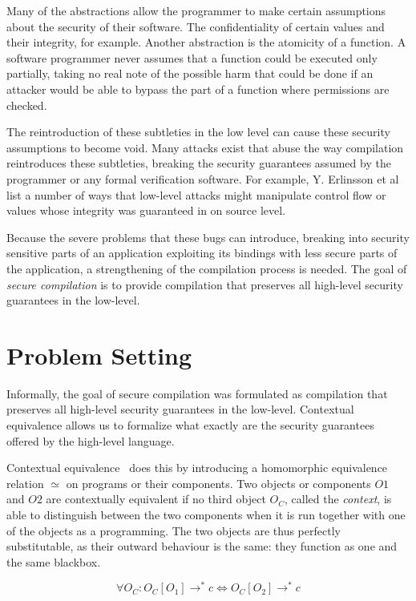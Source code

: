 \documentclass[11pt]{article}
\begin{document}
Many of the abstractions allow the programmer to make certain assumptions about the security of their software.
The confidentiality of certain values and their integrity, for example.
Another abstraction is the atomicity of a function.
A software programmer never assumes that a function could be executed only partially, taking no real note of the possible harm that could be done if an attacker would be able to bypass the part of a function where permissions are checked.

The reintroduction of these subtleties in the low level can cause these security assumptions to become void.
Many attacks exist that abuse the way compilation reintroduces these subtleties, breaking the security guarantees assumed by the programmer or any formal verification software.
For example, Y. Erlinsson et al~\cite{OVSPaper} list a number of ways that low-level attacks might manipulate control flow or values whose integrity was guaranteed in on source level.

Because the severe problems that these bugs can introduce, breaking into security sensitive parts of an application exploiting its bindings with less secure parts of the application, a strengthening of the compilation process is needed.
The goal of \emph{secure compilation} is to provide compilation that preserves all high-level security guarantees in the low-level.

\section{Problem Setting}
Informally, the goal of secure compilation was formulated as compilation that preserves all high-level security guarantees in the low-level.
Contextual equivalence allows us to formalize what exactly are the security guarantees offered by the high-level language.

Contextual equivalence~\cite{Agten:2012:SCM:2354412.2355247} does this by introducing a homomorphic equivalence relation $\simeq$ on programs or their components.
Two objects or components $O1$ and $O2$ are contextually equivalent if no third object $O_C$, called the \emph{context}, is able to distinguish between the two components when it is run together with one of the objects as a programming.
The two objects are thus perfectly substitutable, as their outward behaviour is the same: they function as one and the same blackbox.

\[
 \forall O_C : O_C[O_1] \rightarrow^* c \iff O_C[O_2] \rightarrow^* c
\]
\end{document}
